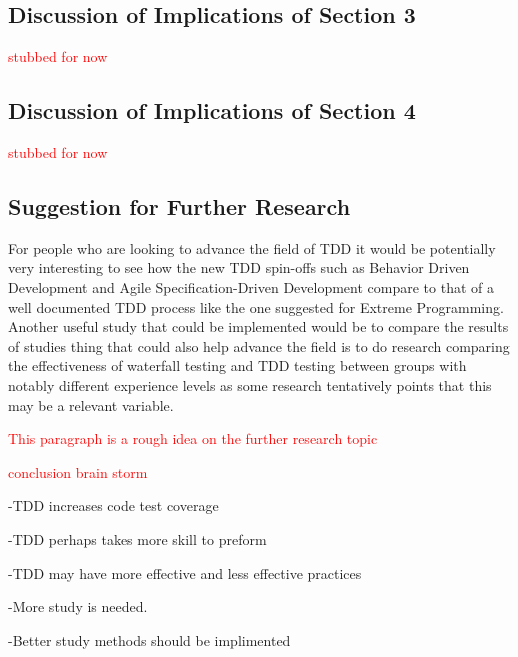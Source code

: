 \documentclass{sig-alternate}
\newcommand{\mycomment}[1]{\textcolor{red}{#1}}
\begin{document}
\subsection{Discussion of Implications of Section 3}

\mycomment{stubbed for now}

\subsection{Discussion of Implications of Section 4}
\mycomment{stubbed for now}
\subsection{Suggestion for Further Research}
For people who are looking to advance the field of TDD it would be potentially very interesting to see how the new TDD spin-offs such as Behavior Driven Development and Agile Specification-Driven Development compare to that of a well documented TDD process like the one suggested for Extreme Programming.  Another useful study that could be implemented would be to compare the results of studies thing that could also help advance the field is to do research comparing the effectiveness of waterfall testing and TDD testing between groups with notably different experience levels as some research tentatively points that this may be a relevant variable.

\mycomment{This paragraph is a rough idea on the further research topic}

\mycomment{conclusion brain storm}

-TDD increases code test coverage

-TDD perhaps takes more skill to preform

-TDD may have more effective and less effective practices

-More study is needed.

-Better study methods should be implimented


  
\end{document}
